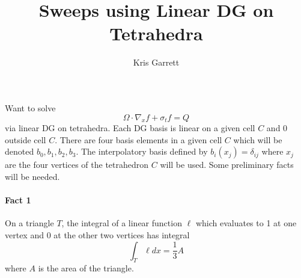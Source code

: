 \documentclass[12pt,letterpaper]{article}
\author{Kris Garrett}
\title{Sweeps using Linear DG on Tetrahedra}
\begin{document}
\maketitle

Want to solve
\begin{equation}
\Omega \cdot \nabla_x f + \sigma_t f = Q
\end{equation}
via linear DG on tetrahedra.
Each DG basis is linear on a given cell $C$ and $0$ outside cell $C$.
There are four basis elements in a given cell $C$ which will be denoted $b_0, b_1, b_2, b_3$.
The interpolatory basis defined by $b_i(x_j) = \delta_{ij}$ where $x_j$ are the four vertices of the tetrahedron $C$ will be used.
Some preliminary facts will be needed.


\paragraph{Fact 1}
On a triangle $T$, the integral of a linear function $\ell$ which evaluates to 1 at one vertex and 0 at the other two vertices has integral
\begin{equation}
\int_T \ell dx = \frac{1}{3} A
\end{equation}
where $A$ is the area of the triangle.
\end{document}
